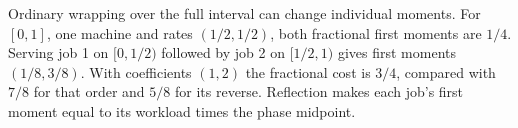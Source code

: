 

Ordinary wrapping over the full interval can change individual moments. For $[0,1]$, one machine and rates $(1/2,1/2)$, both fractional first moments are $1/4$. Serving job 1 on $[0,1/2)$ followed by job 2 on $[1/2,1)$ gives first moments $(1/8,3/8)$. With coefficients $(1,2)$ the fractional cost is $3/4$, compared with $7/8$ for that order and $5/8$ for its reverse. Reflection makes each job's first moment equal to its workload times the phase midpoint.
